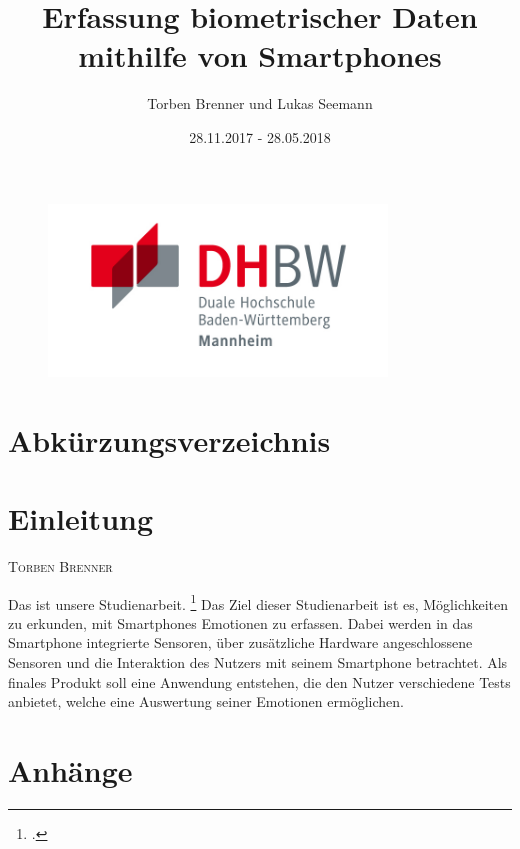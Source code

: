 \documentclass[12pt,titlepage,ngerman]{article}
\newcommand{\sectionauthor}[1]{%
	\begin{flushright}
			{\parindent0pt\vspace*{-33pt}%
			\linespread{1.1}\large\scshape#1%
			\par\nobreak\vspace*{5pt}}
	\end{flushright}
}
\begin{document}
\begin{titlepage}
	\begin{figure}
		\centering
		\includegraphics[width=9cm]{Bilder/DHBW_MA_Logo.jpg}
	\end{figure}%
	\title{Erfassung biometrischer Daten mithilfe von Smartphones}	
	\date{28.11.2017 - 28.05.2018}
	\author{Torben Brenner und Lukas Seemann}
	\maketitle
\end{titlepage}
\singlespacing
{}
\tableofcontents
\newpage
\section*{Abkürzungsverzeichnis}
\begin{acronym}[*********]
\end{acronym}
\newpage
{}
\listoffigures
\newpage

\listoftables
\newpage

\onehalfspacing
\section{Einleitung}
\sectionauthor{Torben Brenner}
Das ist unsere Studienarbeit. \footcite[Vgl.][S. 9000]{Test123}
Das Ziel dieser Studienarbeit ist es, Möglichkeiten zu erkunden, mit Smartphones Emotionen zu erfassen. 
Dabei werden in das Smartphone integrierte Sensoren, über zusätzliche Hardware angeschlossene Sensoren und die Interaktion des 
Nutzers mit seinem Smartphone betrachtet.
Als finales Produkt soll eine Anwendung entstehen, die den Nutzer verschiedene Tests anbietet, welche eine Auswertung seiner 
Emotionen ermöglichen.
\newpage

\newpage

\newpage

\newpage


\newpage
{}
\printbibliography
\newpage

\section*{Anhänge}
\end{document}
